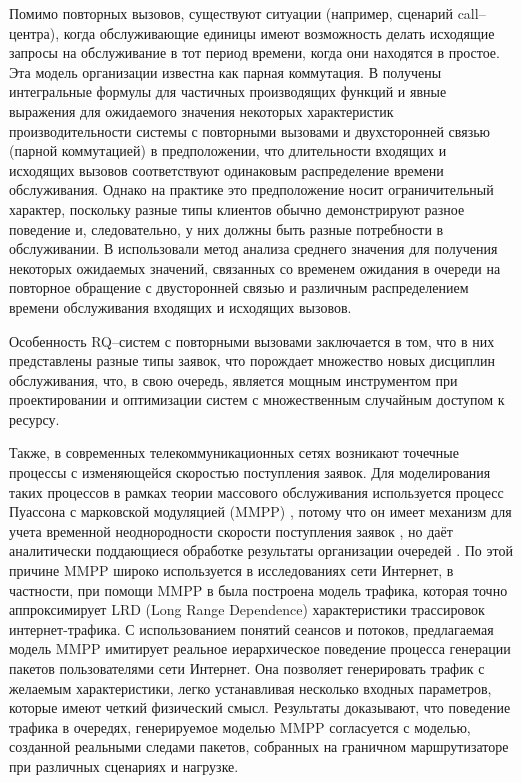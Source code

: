Помимо повторных вызовов, существуют ситуации (например, сценарий call--центра), когда обслуживающие единицы имеют возможность делать исходящие запросы на обслуживание в тот период времени, когда они находятся в простое. Эта модель организации известна как парная коммутация. В \cite{falin1979model} получены интегральные формулы для частичных производящих функций и явные выражения для ожидаемого значения некоторых характеристик производительности системы с повторными вызовами и двухсторонней связью (парной коммутацией) в предположении, что длительности входящих и исходящих вызовов соответствуют одинаковым распределение времени обслуживания. Однако на практике это предположение носит ограничительный характер, поскольку разные типы клиентов обычно демонстрируют разное поведение и, следовательно, у них должны быть разные потребности в обслуживании. В \cite{artalejo2010mean} использовали метод анализа среднего значения для получения некоторых ожидаемых значений, связанных со временем ожидания в очереди на повторное обращение с двусторонней связью и различным распределением времени обслуживания входящих и исходящих вызовов.

Особенность RQ--систем с повторными вызовами заключается в том, что в них представлены разные типы заявок, что порождает множество новых дисциплин обслуживания, что, в свою очередь, является мощным инструментом при проектировании и оптимизации систем с множественным случайным доступом к ресурсу.

Также, в современных телекоммуникационных сетях возникают точечные процессы с изменяющейся скоростью поступления заявок. Для моделирования таких процессов в рамках теории массового обслуживания используется процесс Пуассона с марковской модуляцией (MMPP) \cite{baiocchi1993steady,lapatin2019asymptotic}, потому что он имеет механизм для учета временной неоднородности скорости поступления заявок , но даёт аналитически поддающиеся обработке результаты организации очередей \cite{meier1987fitting}. По этой причине MMPP широко используется в исследованиях сети Интернет, в частности, при помощи MMPP в  \cite{muscariello2004mmpp} была построена модель трафика, которая точно аппроксимирует LRD (Long Range Dependence) характеристики трассировок интернет-трафика. С использованием понятий сеансов и потоков, предлагаемая модель MMPP имитирует реальное иерархическое поведение процесса генерации пакетов пользователями сети Интернет. Она позволяет генерировать трафик с желаемым характеристики, легко устанавливая несколько входных параметров, которые имеют четкий физический смысл. Результаты доказывают, что поведение трафика в очередях, генерируемое моделью MMPP согласуется с моделью, созданной реальными следами пакетов, собранных на граничном маршрутизаторе при различных сценариях и нагрузке.

